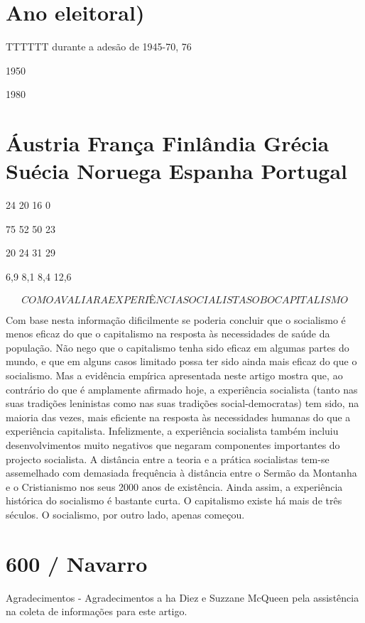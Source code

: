 {{{\section{Ano eleitoral)}
 \par 
TTTTTT durante a adesão de 1945-70, {\color{blue}76}
 \par 
1950
 \par 
1980
 \par 
\section{Áustria França Finlândia Grécia Suécia Noruega Espanha Portugal}
 \par 
24 {\color{blue}20} 16 {\color{blue}0}
 \par 
75 {\color{blue}52} 50 {\color{blue}23}
 \par 
20 {\color{blue}24} 31 {\color{blue}29}
 \par 
6,9 8,1 8,4 12,6
 \par 
\[COMO AVALIAR A EXPERIÊNCIA SOCIALISTA SOB O CAPITALISMO\]
 \par 
Com base nesta informação dificilmente se poderia concluir que o socialismo é menos eficaz do que o capitalismo na resposta às necessidades de saúde da população. Não nego que o capitalismo tenha sido eficaz em algumas partes do mundo, e que em alguns casos limitado possa ter sido ainda mais eficaz do que o socialismo. Mas a evidência empírica apresentada neste artigo mostra que, ao contrário do que é amplamente afirmado hoje, a experiência socialista (tanto nas suas tradições leninistas como nas suas tradições social-democratas) tem sido, na maioria das vezes, mais eficiente na resposta às necessidades humanas do que a experiência capitalista. Infelizmente, a experiência socialista também incluiu desenvolvimentos muito negativos que negaram componentes importantes do projecto socialista. A distância entre a teoria e a prática socialistas tem-se assemelhado com demasiada frequência à distância entre o Sermão da Montanha e o Cristianismo nos seus 2000 anos de existência. Ainda assim, a experiência histórica do socialismo é bastante curta. O capitalismo existe há mais de três séculos. O socialismo, por outro lado, apenas começou.
 \par 
\section{600 / Navarro}
 \par 
Agradecimentos - Agradecimentos a ha Diez e Suzzane McQueen pela assistência na coleta de informações para este artigo.
 \par 
}}}
